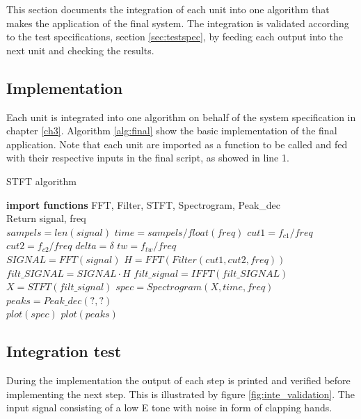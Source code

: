 This section documents the integration of each unit into one algorithm that makes the application of the final system. The integration is validated according to the test specifications, section \ref{sec:testspec}, by feeding each output into the next unit and checking the results. 

\subsection{Implementation}
Each unit is integrated into one algorithm on behalf of the system specification in chapter \ref{ch3}. Algorithm \ref{alg:final} show the basic implementation of the final application. Note that each unit are imported as a function to be called and fed with their respective inputs in the final script, as showed in line 1.
\begin{algorithm}[H]
\caption{STFT algorithm}
\label{STFTalg}
\begin{algorithmic}[1]
\State \textbf{import functions} FFT, Filter, STFT, Spectrogram, Peak\_dec  
\\
\State Return signal, freq 
\EndProcedure 
\\
\State $sampels = len(signal)$ 
\State $time   = sampels/float(freq)$
\State $cut1 = f_{c1}/freq$ 
\State $cut2 = f_{c2}/freq$
\State $delta = \delta$
\State $tw = f_{tw}/freq$
\\
\State $SIGNAL = FFT(signal) $
\State $H = FFT(Filter(cut1,cut2,freq))$
\State $filt\_SIGNAL = SIGNAL \cdot H$
\State $filt\_signal = IFFT(filt\_SIGNAL)$  
\EndProcedure 
\\
\State $X = STFT(filt\_signal)$
\State $spec = Spectrogram(X,time,freq)$
\State $peaks = Peak\_dec(?,?)$
\EndProcedure
\\
\State $plot(spec)$ 
\State $plot(peaks)$
\EndProcedure
\end{algorithmic}
\label{alg:final}
\end{algorithm}      

\subsection{Integration test}
During the implementation the output of each step is printed and verified before implementing the next step. This is illustrated by figure \ref{fig:inte_validation}. The input signal consisting of a low E tone with noise in form of clapping hands.  

